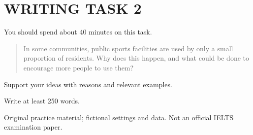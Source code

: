\section*{WRITING TASK 2}
You should spend about 40 minutes on this task.

\begin{quote}\large In some communities, public sports facilities are used by only a small proportion of residents. Why does this happen, and what could be done to encourage more people to use them?
\end{quote}
Support your ideas with reasons and relevant examples.

Write at least 250 words.
\par\bigskip
{\footnotesize\color{gray} Original practice material; fictional settings and data. Not an official IELTS examination paper.}
